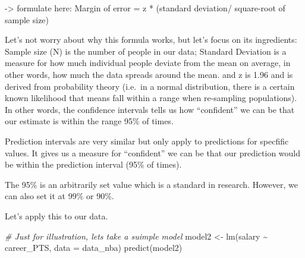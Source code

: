 \documentclass[
]{book}
\newenvironment{Shaded}{\begin{snugshade}}{\end{snugshade}}
\newcommand{\AttributeTok}[1]{\textcolor[rgb]{0.77,0.63,0.00}{#1}}
\newcommand{\AttributeTok}[1]{\textcolor[rgb]{0.13,0.29,0.53}{#1}}
\newcommand{\CommentTok}[1]{\textcolor[rgb]{0.56,0.35,0.01}{\textit{#1}}}
\newcommand{\FunctionTok}[1]{\textcolor[rgb]{0.00,0.00,0.00}{#1}}
\newcommand{\FunctionTok}[1]{\textcolor[rgb]{0.13,0.29,0.53}{\textbf{#1}}}
\newcommand{\NormalTok}[1]{#1}
\newcommand{\OtherTok}[1]{\textcolor[rgb]{0.56,0.35,0.01}{#1}}
\newcommand{\SpecialCharTok}[1]{\textcolor[rgb]{0.00,0.00,0.00}{#1}}
\newcommand{\SpecialCharTok}[1]{\textcolor[rgb]{0.81,0.36,0.00}{\textbf{#1}}}
\begin{document}
-\textgreater{} formulate here: Margin of error = z * (standard deviation/ square-root of sample size)

Let's not worry about why this formula works, but let's focus on its ingredients: Sample size (N) is the number of people in our data; Standard Deviation is a measure for how much individual people deviate from the mean on average, in other words, how much the data spreads around the mean. and z is 1.96 and is derived from probability theory (i.e.~in a normal distribution, there is a certain known likelihood that means fall within a range when re-sampling populations). In other words, the confidence intervals tells us how ``confident'' we can be that our estimate is within the range 95\% of times.

Prediction intervals are very similar but only apply to predictions for specfific values. It gives us a measure for ``confident'' we can be that our prediction would be within the prediction interval (95\% of times).

The 95\% is an arbitrarily set value which is a standard in research. However, we can also set it at 99\% or 90\%.

Let's apply this to our data.

\begin{Shaded}
\begin{Highlighting}[]
\CommentTok{\# Just for illustration, let\textquotesingle{}s take a suimple model}
\NormalTok{model2 }\OtherTok{\textless{}{-}} \FunctionTok{lm}\NormalTok{(salary }\SpecialCharTok{\textasciitilde{}}\NormalTok{ career\_PTS, }\AttributeTok{data =}\NormalTok{ data\_nba)}
\FunctionTok{predict}\NormalTok{(model2)}
\end{Highlighting}
\end{Shaded}
\end{document}
